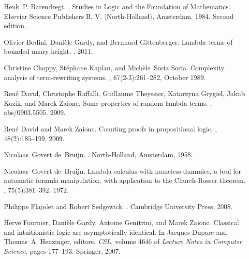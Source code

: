 \documentclass[preprint,authoryear]{elsarticle}
\begin{document}
\begin{thebibliography}{10}

Henk~P. Barendregt.
.
\newblock Studies in Logic and the Foundation of Mathematics. Elsevier Science
  Publishers B. V. (North-Holland), Amsterdam, 1984.
\newblock Second edition.

Olivier Bodini, Dani{\`e}le Gardy, and Bernhard Gittenberger.
\newblock Lambda-terms of bounded unary height.
, 2011.

Christine Choppy, St{\'e}phane Kaplan, and Mich{\`e}le~Soria Soria.
\newblock Complexity analysis of term-rewriting systems.
, 67(2-3):261--282, October 1989.

Ren{\'e} David, Christophe Raffalli, Guillaume Theyssier, Katarzyna Grygiel,
  Jakub Kozik, and Marek Zaionc.
\newblock Some properties of random lambda terms.
, abs/0903.5505, 2009.

Ren{\'e} David and Marek Zaionc.
\newblock Counting proofs in propositional logic.
, 48(2):185--199, 2009.

Nicolaas~Govert de~Bruijn.
.
\newblock North-Holland, Amsterdam, 1958.

Nicolaas~Govert de~Bruijn.
\newblock Lambda calculus with nameless dummies, a tool for automatic formula
  manipulation, with application to the {Church-Rosser} theorem.
,
  75(5):381--392, 1972.

Philippe Flajolet and Robert Sedgewick.
.
\newblock Cambridge University Press, 2008.

Herv{\'e} Fournier, Dani{\`e}le Gardy, Antoine Genitrini, and Marek Zaionc.
\newblock Classical and intuitionistic logic are asymptotically identical.
\newblock In Jacques Duparc and Thomas~A. Henzinger, editors, {\em CSL}, volume
  4646 of {\em Lecture Notes in Computer Science}, pages 177--193. Springer,
  2007.


\end{thebibliography}
\end{document}
